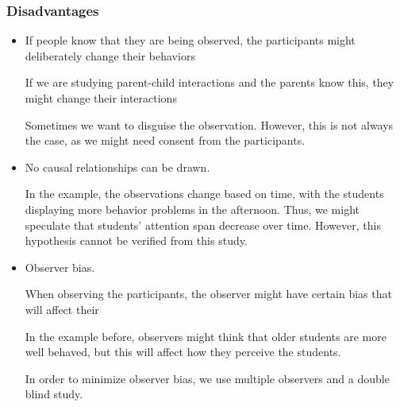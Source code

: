 \documentclass[../main/main.tex]{subfiles}
\begin{document}
\subsubsection{Disadvantages}
\begin{itemize}
\item If people know that they are being observed, the participants might deliberately change their behaviors
        \begin{example}
If we are studying parent-child interactions and the parents know this, they might change their interactions
        \end{example}
        \begin{remark}
Sometimes we want to disguise the observation. However, this is not always the case, as we might need consent from the participants.
        \end{remark}
  \item No causal relationships can be drawn.
\begin{example}
In the example, the observations change based on time, with the students displaying more behavior problems in the afternoon. Thus, we might speculate that students' attention span decrease over time. However, this hypothesis cannot be verified from this study.
\end{example}
  \item Observer bias.
        \begin{definition}
When observing the participants, the observer might have certain bias that will affect their
        \end{definition}
        \begin{example}
In the example before, observers might think that older students are more well behaved, but this will affect how they perceive the students.
        \end{example}
\begin{remark}
In order to minimize observer bias, we use multiple observers and a double blind study.
\end{remark}
\end{itemize}
\end{document}
